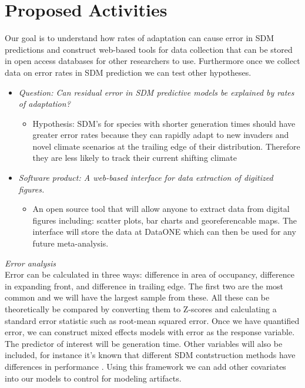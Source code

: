 \documentclass[pdftex,11pt,a4paper]{article}\usepackage{graphicx, color}
\begin{document}
\section*{Proposed Activities}
Our goal is to understand how rates of adaptation can cause error in SDM predictions and construct web-based tools for data collection that can be stored in open access databases for other researchers to use.  Furthermore once we collect data on error rates in SDM prediction we can test other hypotheses.

\begin{itemize}
    \item \textit{Question: Can residual error in SDM predictive models be explained by rates of adaptation?}
      \begin{itemize}
        \item Hypothesis: SDM's for species with shorter generation times should have greater error rates because they can rapidly adapt to new invaders and novel climate scenarios at the trailing edge of their distribution.  Therefore they are less likely to track their current shifting climate
        \end{itemize}
    \item \textit{Software product: A web-based interface for data extraction of digitized figures.}
      \begin{itemize}
        \item An open source tool that will allow anyone to extract data from digital figures including: scatter plots, bar charts and georeferencable maps.  The interface will store the data at DataONE which can then be used for any future meta-analysis.
        \end{itemize} 
\end{itemize}

\textit{Error analysis} \\
Error can be calculated in three ways: difference in area of occupancy, difference in expanding front, and difference in trailing edge.  The first two are the most common and we will have the largest sample from these.  All these can be theoretically be compared by converting them to Z-scores and calculating a standard error statistic such as root-mean squared error.  Once we have quantified error, we can construct mixed effects models with error as the response variable.  The predictor of interest will be generation time.  Other variables will also be included, for instance it's known that different SDM contstruction methods have differences in performance \citep{Elith2006, Elith2010}.  Using this framework we can add other covariates into our models to control for modeling artifacts. 






\end{document}

